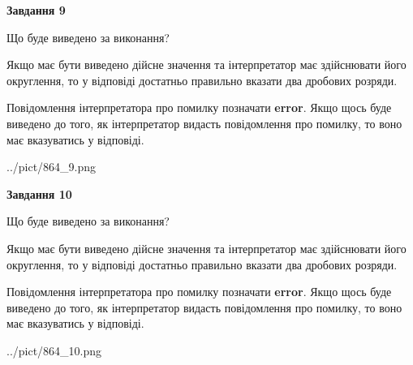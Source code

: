 \documentclass[12pt, ukrainian]{article}
\begin{document}
{\begin {Large}
{\begin {center}\textbf{Завдання 9}\end {center}}\par
Що буде виведено за виконання? \par

Якщо має бути виведено дійсне значення та інтерпретатор має здійснювати його округлення, 
то у відповіді достатньо правильно вказати два дробових розряди.

Повідомлення інтерпретатора про помилку позначати \textbf{error}.
Якщо щось буде виведено до того, як інтерпретатор видасть повідомлення про помилку, 
то воно має вказуватись у відповіді. \par

\begin{center}
	{../pict/864_9.png}
\end{center}
\newpage

{\begin {center}\textbf{Завдання 10}\end {center}}\par
Що буде виведено за виконання? \par

Якщо має бути виведено дійсне значення та інтерпретатор має здійснювати його округлення, 
то у відповіді достатньо правильно вказати два дробових розряди.

Повідомлення інтерпретатора про помилку позначати \textbf{error}.
Якщо щось буде виведено до того, як інтерпретатор видасть повідомлення про помилку, 
то воно має вказуватись у відповіді. \par

\begin{center}
	{../pict/864_10.png}
\end{center}
\newpage

\end {Large}}
\end{document}
